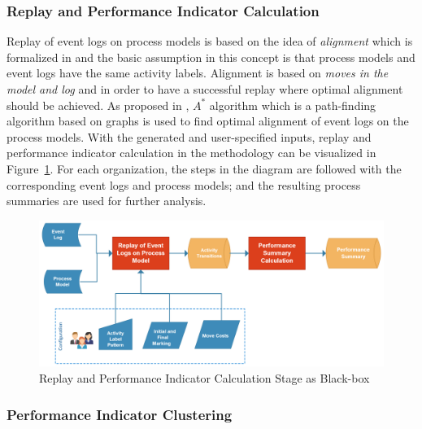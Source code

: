 \subsubsection{Replay and Performance Indicator Calculation}
\label{subsubsec:replay-and-performance-summary}
Replay of event logs on process models is based on the idea of \textit{alignment} which is formalized in \cite{van2012replaying} and the basic assumption in this concept is that process models and event logs have the same activity labels. Alignment is based on \textit{moves in the model and log} and in order to have a successful replay where optimal alignment should be achieved. As proposed in \cite{adriansyah2011conformance, adriansyah2011towards}, $A^{*}$ algorithm which is a path-finding algorithm based on graphs is used to find optimal alignment of event logs on the process models. With the generated and user-specified inputs, replay and performance indicator calculation in the methodology can be visualized in Figure~\ref{fig:replay-and-performance-indicator-calculation}. For each organization, the steps in the diagram are followed with the corresponding event logs and process models; and the resulting process summaries are used for further analysis.

\begin{figure}
  \centering
  \includegraphics[width=\textwidth]{4_methodology/replay-and-performance-indicator-calculation}
  \caption{Replay and Performance Indicator Calculation Stage as Black-box}
  \label{fig:replay-and-performance-indicator-calculation}
\end{figure}

\subsubsection{Performance Indicator Clustering}
\label{subsubsec:performance-indicator-clustering}

